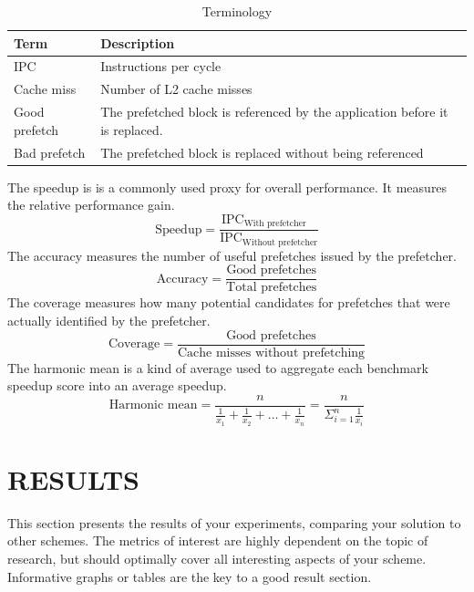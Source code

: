 \documentclass[conference]{IEEEtran}
\begin{document}
\begin{table}[H]
    \centering
    \begin{tabular}{l | p{4cm} }
        Term                & Description                    \\
        \hline
        IPC                 & Instructions per cycle        \\
        Cache miss          & Number of L2 cache misses      \\
        Good prefetch       & The prefetched block is referenced by the application before it is replaced. \\
        Bad prefetch        & The prefetched block is replaced without being referenced             \\
    \end{tabular}
    \vspace{5mm}
    \caption{Terminology}
    \label{tab:terminology}
    \vspace{-5mm}
\end{table}

The speedup is is a commonly used proxy for overall performance. It measures the relative performance gain. 
\[
    \text{Speedup} = \frac{\text{IPC}_{\text{With prefetcher}\phantom{ou}}}{\text{IPC}_\text{Without prefetcher}}
\]
The accuracy measures the number of useful prefetches issued by the prefetcher.
\[
    \text{Accuracy} = \frac{\text{Good prefetches}}{\text{Total prefetches}}
\]
The coverage measures how many potential candidates for prefetches that were actually identified by the prefetcher. 
\[
    \text{Coverage} = \frac{\text{Good prefetches}}{\text{Cache misses without prefetching}}
\]
The harmonic mean is a kind of average used to aggregate each benchmark speedup score into an average speedup. 
\[
    \text{Harmonic mean} = \frac{n}{\frac{1}{x_1} + \frac{1}{x_2}+\dots+\frac{1}{x_n}} = \frac{n}{\Sigma_{i=1}^n \frac{1}{x_i}}
\]


\pagebreak 
\section{RESULTS}

\iffalse
This section presents the results of your experiments, comparing your solution to other schemes. The metrics of interest are highly dependent on the topic of research, but should optimally cover all interesting aspects of your scheme. Informative graphs or tables are the key to a good result section.
\end{document}
